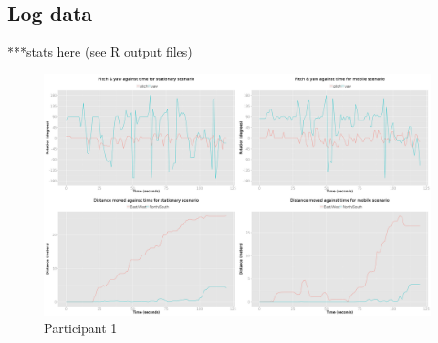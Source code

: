 \subsection{Log data}



	

		

***stats here (see R output files)


	\begin{figure}[h]
		\begin{center}
			\includegraphics[width=\linewidth]{images/24072014_1200_4up.png}
			\caption{Participant 1}
			\label{participant_1_4up}
		\end{center}
	\end{figure}

